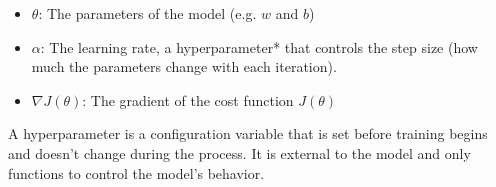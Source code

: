 \documentclass{article}
\begin{document}
\begin{itemize}
\item $\theta$: The parameters of the model (e.g. $w$ and $b$)
\item $\alpha$: The learning rate, a hyperparameter* that controls the step size (how much the parameters change with each iteration).
\item $\nabla J(\theta)$: The gradient of the cost function $J(\theta)$
\end{itemize}
\noindent *A hyperparameter is a configuration variable that is set before training begins and doesn't change during the process. It is external to the model and only functions to control the model's behavior.
\end{document}
